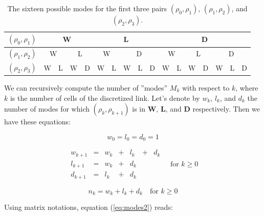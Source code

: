 \begin{table}[ht]
\centering %
\begin{tabular}{|c|c|c|c|c|c|c|c|c|c|c|c|c|c|c|c|c|}
  \hline
  $(\rho_{0},\rho_{1})$ & \multicolumn{4}{|c|}{W} & \multicolumn{5}{|c|}{L} & \multicolumn{7}{|c|}{D}\\
  \hline
  $(\rho_{1},\rho_{2})$ & \multicolumn{2}{|c|}{W} & \multicolumn{2}{|c|}{L} & \multicolumn{2}{|c|}{W} & \multicolumn{3}{|c|}{D} & \multicolumn{2}{|c|}{W} & \multicolumn{2}{|c|}{L} & \multicolumn{3}{|c|}{D}\\
  \hline
  $(\rho_{2},\rho_{3})$ & W & L & W & D & W & L & W & L & D & W & L & W & D & W & L & D\\
  \hline
\end{tabular}
\caption{The sixteen possible modes for the first three pairs $(\rho_{0},\rho_{1})$, $(\rho_{1},\rho_{2})$, and $(\rho_{2},\rho_{3})$.}
\label{table:threeLevelModes} %
\end{table}

We can recursively compute the number of ''modes'' $M_{k}$ with respect to $k$, where $k$ is the number of cells of the discretized link. Let's denote by $w_{k}$, $l_{k}$, and $d_{k}$ the number of modes for which $(\rho_{k},\rho_{k+1})$ is in \textbf{W}, \textbf{L}, and \textbf{D} respectively. Then we have these equations: 

\begin{equation}
w_{0} = l_{0} = d_{0} = 1
\label{eq:modes1}
\end{equation}

\begin{equation}
\begin{array}{lllllll}
w_{k+1} & = & w_{k} & + & l_{k} & + & d_{k}\\
l_{k+1} & = & w_{k} & + & d_{k} & & \\
d_{k+1} & = & l_{k} & + & d_{k} & &
\end{array} \quad \text{for }k \geq 0
\label{eq:modes2}
\end{equation}

\begin{equation}
n_{k} = w_{k} + l_{k} + d_{k} \quad \text{for }k \geq 0
\label{eq:modes3}
\end{equation}

Using matrix notations, equation (\ref{eq:modes2}) reads:

